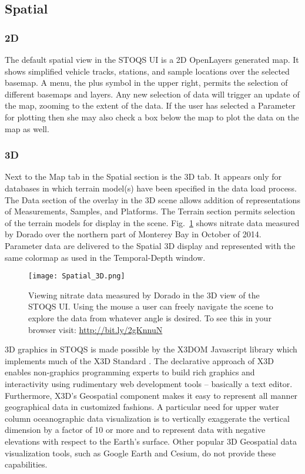 \documentclass[conference]{IEEEtran}
\begin{document}
\subsection{Spatial}

\subsubsection{2D}
The default spatial view in the STOQS UI is a 2D OpenLayers generated map. It shows 
simplified vehicle tracks, stations, and sample locations over the selected basemap. A menu, the plus symbol
in the upper right, permits the selection of different basemaps and 
layers. Any new selection of data will trigger an update
of the map, zooming to the extent of the data. If the user has selected a Parameter for plotting
then she may also check a box below the map to plot the data on the map as well.

\subsubsection{3D}
Next to the Map tab in the Spatial section is the 3D tab. It appears 
only for databases in which terrain model(s) have been specified in the data load process. 
The Data section of
the overlay in the 3D scene allows addition of representations of Measurements,
Samples, and Platforms. The Terrain section permits selection of the terrain
models for display in the scene. Fig.~\ref{fig:Spatial_3D} shows nitrate data 
measured by Dorado over the northern part of Monterey Bay in October of 2014. 
Parameter data are delivered to the Spatial 3D display and represented with the same
colormap as used in the Temporal-Depth window.

\begin{figure}[htbp]
\centering
\texttt{[image: Spatial\_3D.png]}
\caption{Viewing nitrate data measured by Dorado in the 3D view of the STOQS UI.
Using the mouse a user can freely navigate the scene to explore the data from 
whatever angle is desired. To see this in your browser visit: \url{http://bit.ly/2gKnnuN}}
\label{fig:Spatial_3D}
\end{figure}

3D graphics in STOQS is made possible by the X3DOM Javascript library \cite{Behr:2010:SAH:1836049.1836077} 
which implements much of the X3D Standard \cite{x3d07}. The declarative approach of X3D
enables non-graphics programming experts to build rich graphics and interactivity 
using rudimentary web development tools -- basically a text editor. Furthermore, X3D's Geospatial component
\cite{Plesch:2015:XGC:2775292.2775315}
makes it easy to represent all manner geographical data in customized fashions. 
A particular need for upper water column oceanographic data visualization is to
vertically exaggerate the vertical dimension by a factor of 10 or more and to
represent data with negative elevations with respect to the Earth's surface.
Other popular 3D Geospatial data visualization tools, such as Google Earth 
and Cesium, do not provide these capabilities.
\end{document}
